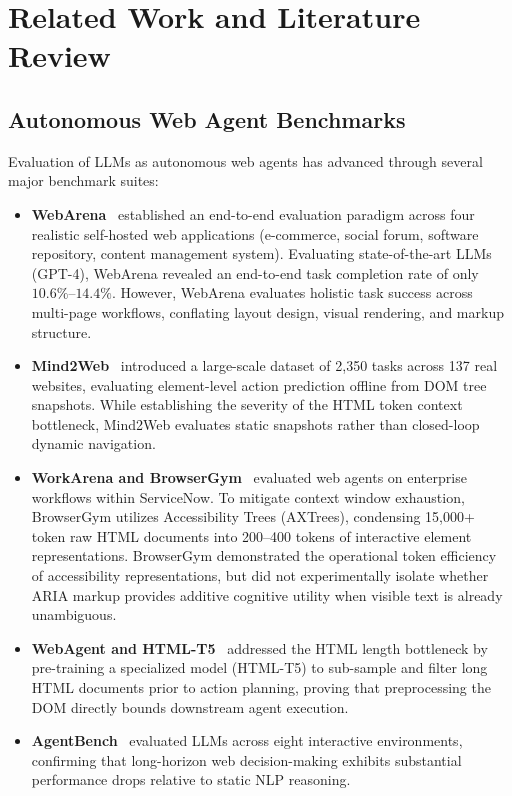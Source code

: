 \documentclass[11pt,a4paper]{article}
\begin{document}
\section{Related Work and Literature Review}
\label{sec:related}

\subsection{Autonomous Web Agent Benchmarks}
Evaluation of LLMs as autonomous web agents has advanced through several major benchmark suites:
\begin{itemize}
    \item \textbf{WebArena}~\cite{zhou2024webarena} established an end-to-end evaluation paradigm across four realistic self-hosted web applications (e-commerce, social forum, software repository, content management system). Evaluating state-of-the-art LLMs (GPT-4), WebArena revealed an end-to-end task completion rate of only $10.6\%$--$14.4\%$. However, WebArena evaluates holistic task success across multi-page workflows, conflating layout design, visual rendering, and markup structure.
    \item \textbf{Mind2Web}~\cite{deng2023mind2web} introduced a large-scale dataset of 2,350 tasks across 137 real websites, evaluating element-level action prediction offline from DOM tree snapshots. While establishing the severity of the HTML token context bottleneck, Mind2Web evaluates static snapshots rather than closed-loop dynamic navigation.
    \item \textbf{WorkArena and BrowserGym}~\cite{drouin2024workarena} evaluated web agents on enterprise workflows within ServiceNow. To mitigate context window exhaustion, BrowserGym utilizes Accessibility Trees (AXTrees), condensing 15,000+ token raw HTML documents into 200--400 tokens of interactive element representations. BrowserGym demonstrated the operational token efficiency of accessibility representations, but did not experimentally isolate whether ARIA markup provides additive cognitive utility when visible text is already unambiguous.
    \item \textbf{WebAgent and HTML-T5}~\cite{gur2024webagent} addressed the HTML length bottleneck by pre-training a specialized model (HTML-T5) to sub-sample and filter long HTML documents prior to action planning, proving that preprocessing the DOM directly bounds downstream agent execution.
    \item \textbf{AgentBench}~\cite{liu2024agentbench} evaluated LLMs across eight interactive environments, confirming that long-horizon web decision-making exhibits substantial performance drops relative to static NLP reasoning.
\end{itemize}
\end{document}
